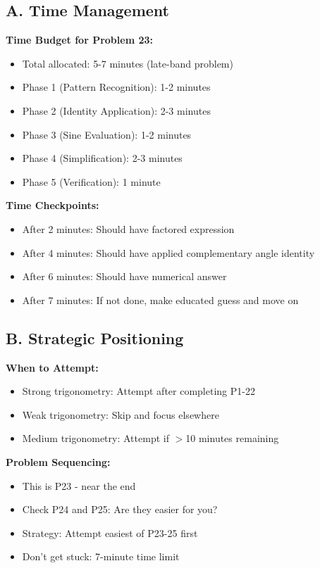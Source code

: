 \documentclass[12pt]{article}
\begin{document}
\begin{competitionbox}

\subsection*{A. Time Management}

\textbf{Time Budget for Problem 23:}
\begin{itemize}
    \item Total allocated: 5-7 minutes (late-band problem)
    \item Phase 1 (Pattern Recognition): 1-2 minutes
    \item Phase 2 (Identity Application): 2-3 minutes
    \item Phase 3 (Sine Evaluation): 1-2 minutes
    \item Phase 4 (Simplification): 2-3 minutes
    \item Phase 5 (Verification): 1 minute
\end{itemize}

\textbf{Time Checkpoints:}
\begin{itemize}
    \item After 2 minutes: Should have factored expression
    \item After 4 minutes: Should have applied complementary angle identity
    \item After 6 minutes: Should have numerical answer
    \item After 7 minutes: If not done, make educated guess and move on
\end{itemize}

\subsection*{B. Strategic Positioning}

\textbf{When to Attempt:}
\begin{itemize}
    \item Strong trigonometry: Attempt after completing P1-22
    \item Weak trigonometry: Skip and focus elsewhere
    \item Medium trigonometry: Attempt if $>$10 minutes remaining
\end{itemize}

\textbf{Problem Sequencing:}
\begin{itemize}
    \item This is P23 - near the end
    \item Check P24 and P25: Are they easier for you?
    \item Strategy: Attempt easiest of P23-25 first
    \item Don't get stuck: 7-minute time limit
\end{itemize}


\end{competitionbox}
\end{document}
